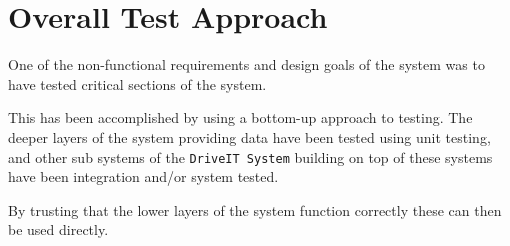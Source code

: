 \section{Overall Test Approach}
One of the non-functional requirements and design goals of the system was to have tested critical sections of the system.

This has been accomplished by using a bottom-up approach to testing. 
The deeper layers of the system providing data have been tested using unit testing, and other sub systems of the \texttt{DriveIT System} building on top of these systems have been integration and/or system tested. 

By trusting that the lower layers of the system function correctly these can then be used directly. 